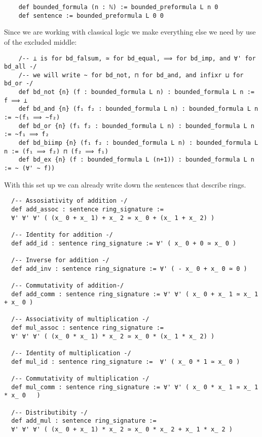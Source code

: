 \begin{dfn}[Formulas]
\begin{lstlisting}
    def bounded_formula (n : ℕ) := bounded_preformula L n 0
    def sentence := bounded_preformula L 0 0\end{lstlisting}

  Since we are working with classical logic we
  make everything else we need by use of the excluded middle:

  \begin{lstlisting}
    /-- ⊥ is for bd_falsum, ≃ for bd_equal, ⟹ for bd_imp, and ∀' for bd_all -/
    /-- we will write ~ for bd_not, ⊓ for bd_and, and infixr ⊔ for bd_or -/
    def bd_not {n} (f : bounded_formula L n) : bounded_formula L n := f ⟹ ⊥
    def bd_and {n} (f₁ f₂ : bounded_formula L n) : bounded_formula L n := ~(f₁ ⟹ ∼f₂)
    def bd_or {n} (f₁ f₂ : bounded_formula L n) : bounded_formula L n := ~f₁ ⟹ f₂
    def bd_biimp {n} (f₁ f₂ : bounded_formula L n) : bounded_formula L n := (f₁ ⟹ f₂) ⊓ (f₂ ⟹ f₁)
    def bd_ex {n} (f : bounded_formula L (n+1)) : bounded_formula L n := ~ (∀' ~ f))
  \end{lstlisting}
\end{dfn}

With this set up we can already write down the sentences that describe rings.

\begin{lstlisting}
  /-- Assosiativity of addition -/
  def add_assoc : sentence ring_signature :=
  ∀' ∀' ∀' ( (x_ 0 + x_ 1) + x_ 2 ≃ x_ 0 + (x_ 1 + x_ 2) )

  /-- Identity for addition -/
  def add_id : sentence ring_signature := ∀' ( x_ 0 + 0 ≃ x_ 0 )

  /-- Inverse for addition -/
  def add_inv : sentence ring_signature := ∀' ( - x_ 0 + x_ 0 ≃ 0 )

  /-- Commutativity of addition-/
  def add_comm : sentence ring_signature := ∀' ∀' ( x_ 0 + x_ 1 ≃ x_ 1 + x_ 0 )

  /-- Associativity of multiplication -/
  def mul_assoc : sentence ring_signature :=
  ∀' ∀' ∀' ( (x_ 0 * x_ 1) * x_ 2 ≃ x_ 0 * (x_ 1 * x_ 2) )

  /-- Identity of multiplication -/
  def mul_id : sentence ring_signature :=  ∀' ( x_ 0 * 1 ≃ x_ 0 )

  /-- Commutativity of multiplication -/
  def mul_comm : sentence ring_signature := ∀' ∀' ( x_ 0 * x_ 1 ≃ x_ 1 * x_ 0   )

  /-- Distributibity -/
  def add_mul : sentence ring_signature :=
  ∀' ∀' ∀' ( (x_ 0 + x_ 1) * x_ 2 ≃ x_ 0 * x_ 2 + x_ 1 * x_ 2 )\end{lstlisting}


